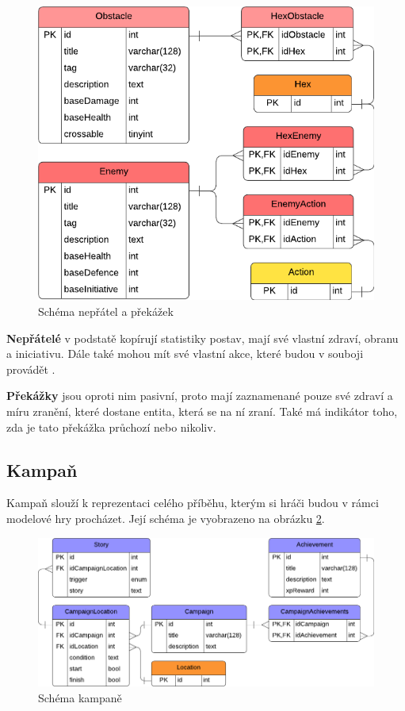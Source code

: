 \begin{figure}[h]
    \centering
    \includegraphics{../../shared/diagrams/er_enemy_obstacle.pdf}
    \caption{Schéma nepřátel a překážek}
    \label{diag:er_enemy_obstacle}
\end{figure}

\textbf{Nepřátelé} v podstatě kopírují statistiky postav, mají své vlastní zdraví, obranu a iniciativu. Dále také mohou mít své vlastní akce, které budou v souboji provádět .

\textbf{Překážky} jsou oproti nim pasivní, proto mají zaznamenané pouze své zdraví a míru zranění, které dostane entita, která se na ní zraní. Také má indikátor toho, zda je tato překážka průchozí  nebo nikoliv.


\subsection{Kampaň}
\label{subsec:schema_campaign}

Kampaň slouží k reprezentaci celého příběhu, kterým si hráči budou v rámci modelové hry procházet. Její schéma je vyobrazeno na obrázku \ref{diag:er_campaign}.

\begin{figure}[h]
    \centering
    \includegraphics[scale=0.8]{../../shared/diagrams/er_campaign.pdf}
    \caption{Schéma kampaně}
    \label{diag:er_campaign}
\end{figure}

